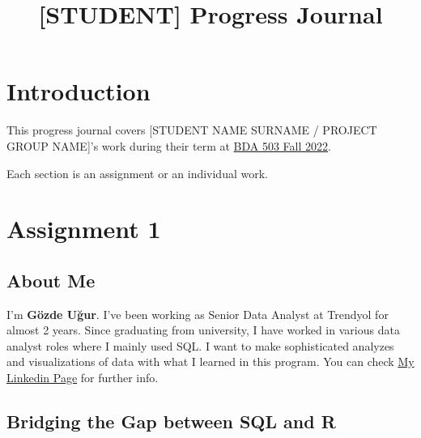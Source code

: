 \documentclass[
  letterpaper,
  DIV=11,
  numbers=noendperiod]{scrreprt}
\title{{[}STUDENT{]} Progress Journal}
\author{}
\date{}
\renewcommand*\contentsname{Table of contents}
\newcommand\contentsname{Table of contents}
\begin{document}
\maketitle
\ifdefined\Shaded\renewenvironment{Shaded}{\begin{tcolorbox}[boxrule=0pt, sharp corners, breakable, borderline west={3pt}{0pt}{shadecolor}, frame hidden, enhanced, interior hidden]}{\end{tcolorbox}}\fi

\renewcommand*\contentsname{Table of contents}
{
\hypersetup{linkcolor=}
\setcounter{tocdepth}{2}
\tableofcontents
}

\hypertarget{introduction}{%
\chapter*{Introduction}\label{introduction}}


This progress journal covers {[}STUDENT NAME SURNAME / PROJECT GROUP
NAME{]}'s work during their term at
\href{https://mef-bda503.github.io/fall22/}{BDA 503 Fall 2022}.

Each section is an assignment or an individual work.


\hypertarget{assignment-1}{%
\chapter{Assignment 1}\label{assignment-1}}

\hypertarget{about-me}{%
\section{About Me}\label{about-me}}

I'm \textbf{Gözde Uğur}. I've been working as Senior Data Analyst at
Trendyol for almost 2 years. Since graduating from university, I have
worked in various data analyst roles where I mainly used SQL. I want to
make sophisticated analyzes and visualizations of data with what I
learned in this program. You can check
\href{https://www.linkedin.com/in/gozde-ugur-000/}{My Linkedin Page} for
further info.

\hypertarget{bridging-the-gap-between-sql-and-r}{%
\section{Bridging the Gap between SQL and
R}\label{bridging-the-gap-between-sql-and-r}}
\end{document}

